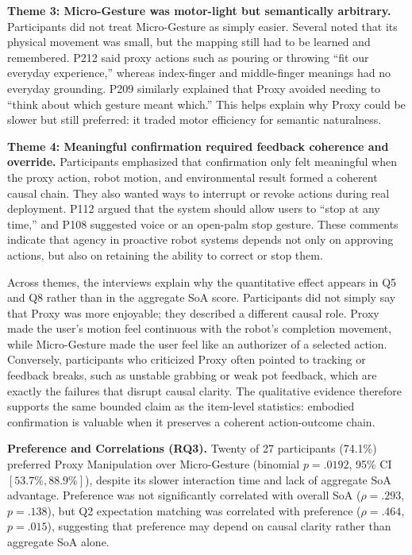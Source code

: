 \documentclass[sigconf,review,anonymous]{acmart}
\begin{document}
\textbf{Theme 3: Micro-Gesture was motor-light but semantically arbitrary.}
Participants did not treat Micro-Gesture as simply easier. Several noted that its physical movement was small, but the mapping still had to be learned and remembered. P212 said proxy actions such as pouring or throwing ``fit our everyday experience,'' whereas index-finger and middle-finger meanings had no everyday grounding. P209 similarly explained that Proxy avoided needing to ``think about which gesture meant which.'' This helps explain why Proxy could be slower but still preferred: it traded motor efficiency for semantic naturalness.

\textbf{Theme 4: Meaningful confirmation required feedback coherence and override.}
Participants emphasized that confirmation only felt meaningful when the proxy action, robot motion, and environmental result formed a coherent causal chain. They also wanted ways to interrupt or revoke actions during real deployment. P112 argued that the system should allow users to ``stop at any time,'' and P108 suggested voice or an open-palm stop gesture. These comments indicate that agency in proactive robot systems depends not only on approving actions, but also on retaining the ability to correct or stop them.

Across themes, the interviews explain why the quantitative effect appears in Q5 and Q8 rather than in the aggregate SoA score. Participants did not simply say that Proxy was more enjoyable; they described a different causal role. Proxy made the user's motion feel continuous with the robot's completion movement, while Micro-Gesture made the user feel like an authorizer of a selected action. Conversely, participants who criticized Proxy often pointed to tracking or feedback breaks, such as unstable grabbing or weak pot feedback, which are exactly the failures that disrupt causal clarity. The qualitative evidence therefore supports the same bounded claim as the item-level statistics: embodied confirmation is valuable when it preserves a coherent action-outcome chain.

\textbf{Preference and Correlations (RQ3).}
Twenty of 27 participants (74.1\%) preferred Proxy Manipulation over Micro-Gesture (binomial $p=.0192$, 95\% CI $[53.7\%,88.9\%]$), despite its slower interaction time and lack of aggregate SoA advantage. Preference was not significantly correlated with overall SoA ($\rho=.293$, $p=.138$), but Q2 expectation matching was correlated with preference ($\rho=.464$, $p=.015$), suggesting that preference may depend on causal clarity rather than aggregate SoA alone.
\end{document}
